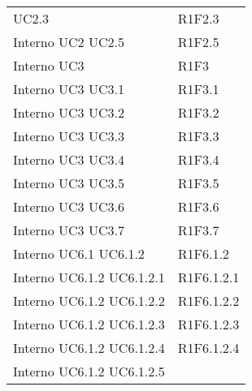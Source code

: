 \begin{longtable}{p{2.5cm}!{\VRule[1pt]}p{2.5cm}}
 \newline UC2.3
 & R1F2.3 \\
Interno \newline UC2
 \newline UC2.5
 & R1F2.5 \\
Interno \newline UC3
 & R1F3 \\
Interno \newline UC3
 \newline UC3.1
 & R1F3.1 \\
Interno \newline UC3
 \newline UC3.2
 & R1F3.2 \\
Interno \newline UC3
 \newline UC3.3
 & R1F3.3 \\
Interno \newline UC3
 \newline UC3.4
 & R1F3.4 \\
Interno \newline UC3
 \newline UC3.5
 & R1F3.5 \\
Interno \newline UC3
 \newline UC3.6
 & R1F3.6 \\
Interno \newline UC3
 \newline UC3.7
 & R1F3.7 \\
Interno \newline UC6.1
 \newline UC6.1.2
 & R1F6.1.2 \\
Interno \newline UC6.1.2
 \newline UC6.1.2.1
 & R1F6.1.2.1 \\
Interno \newline UC6.1.2
 \newline UC6.1.2.2
 & R1F6.1.2.2 \\
Interno \newline UC6.1.2
 \newline UC6.1.2.3
 & R1F6.1.2.3 \\
Interno \newline UC6.1.2
 \newline UC6.1.2.4
 & R1F6.1.2.4 \\
Interno \newline UC6.1.2
 \newline UC6.1.2.5

\end{longtable}
